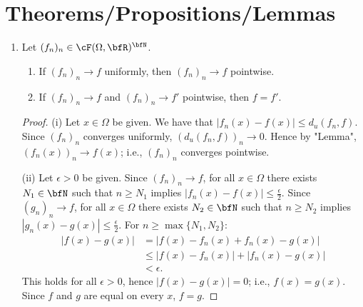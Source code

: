 \section*{Theorems/Propositions/Lemmas}
    \begin{enumerate}[label = (\arabic*)]
        \item Let $(f_n)_n \in \cF(\Omega,\bfR)^\bfN$.
            \begin{enumerate}[label = (\roman*)]
                \item If $(f_n)_n \rightarrow f$ uniformly, then $(f_n)_n \rightarrow f$ pointwise.
                \item If $(f_n)_n \rightarrow f$ and $(f_n)_n \rightarrow f'$ pointwise, then $f = f'$.
            \end{enumerate}
            {\color{red} \begin{proof}
                (i) Let $x \in \Omega$ be given. We have that $|f_n(x) - f(x)| \leq d_u(f_n,f)$. Since $(f_n)_n$ converges uniformly, $(d_u(f_n,f))_n \rightarrow 0$. Hence by "Lemma", $(f_n(x))_n \rightarrow f(x)$; i.e., $(f_n)_n$ converges pointwise.

                (ii) Let $\epsilon > 0$ be given. Since $(f_n)_n \rightarrow f$, for all $x \in \Omega$ there exists $N_1 \in \bfN$ such that $n \geq N_1$ implies $|f_n(x) - f(x)| \leq \frac{\epsilon}{2}$. Since $(g_n)_n \rightarrow f$, for all $x \in \Omega$ there exists $N_2 \in \bfN$ such that $n \geq N_2$ implies $|g_n(x) - g(x)| \leq \frac{\epsilon}{2}$. For $n \geq \max\{N_1, N_2\}$:
                    \begin{equation*}
                    \begin{split}
                        |f(x)-g(x)| 
                        &= |f(x) - f_n(x) + f_n(x) - g(x)| \\
                        &\leq |f(x) - f_n(x)| + |f_n(x) - g(x)| \\
                        & < \epsilon.
                    \end{split}
                    \end{equation*} 
                This holds for all $\epsilon > 0$, hence $|f(x) - g(x)| = 0$; i.e., $f(x) = g(x)$. Since $f$ and $g$ are equal on every $x$, $f=g$.
            \end{proof}}


\end{enumerate}

